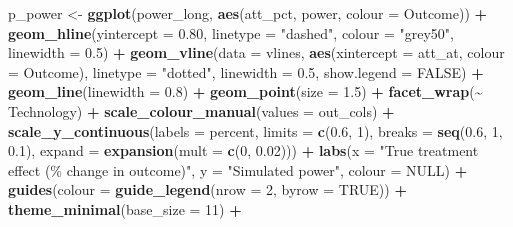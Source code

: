 \documentclass[
]{article}
\newenvironment{Shaded}{\begin{snugshade}}{\end{snugshade}}
\newcommand{\AttributeTok}[1]{\textcolor[rgb]{0.13,0.29,0.53}{#1}}
\newcommand{\ConstantTok}[1]{\textcolor[rgb]{0.56,0.35,0.01}{#1}}
\newcommand{\DecValTok}[1]{\textcolor[rgb]{0.00,0.00,0.81}{#1}}
\newcommand{\FloatTok}[1]{\textcolor[rgb]{0.00,0.00,0.81}{#1}}
\newcommand{\FunctionTok}[1]{\textcolor[rgb]{0.13,0.29,0.53}{\textbf{#1}}}
\newcommand{\NormalTok}[1]{#1}
\newcommand{\OtherTok}[1]{\textcolor[rgb]{0.56,0.35,0.01}{#1}}
\newcommand{\SpecialCharTok}[1]{\textcolor[rgb]{0.81,0.36,0.00}{\textbf{#1}}}
\newcommand{\StringTok}[1]{\textcolor[rgb]{0.31,0.60,0.02}{#1}}
\begin{document}
\begin{Shaded}
\begin{Highlighting}[]
\NormalTok{  p\_power }\OtherTok{\textless{}{-}} \FunctionTok{ggplot}\NormalTok{(power\_long,}
                    \FunctionTok{aes}\NormalTok{(att\_pct, power, }\AttributeTok{colour =}\NormalTok{ Outcome)) }\SpecialCharTok{+}
    \FunctionTok{geom\_hline}\NormalTok{(}\AttributeTok{yintercept =} \FloatTok{0.80}\NormalTok{, }\AttributeTok{linetype =} \StringTok{"dashed"}\NormalTok{,}
               \AttributeTok{colour =} \StringTok{"grey50"}\NormalTok{, }\AttributeTok{linewidth =} \FloatTok{0.5}\NormalTok{) }\SpecialCharTok{+}
    \FunctionTok{geom\_vline}\NormalTok{(}\AttributeTok{data =}\NormalTok{ vlines,}
               \FunctionTok{aes}\NormalTok{(}\AttributeTok{xintercept =}\NormalTok{ att\_at, }\AttributeTok{colour =}\NormalTok{ Outcome),}
               \AttributeTok{linetype =} \StringTok{"dotted"}\NormalTok{, }\AttributeTok{linewidth =} \FloatTok{0.5}\NormalTok{, }\AttributeTok{show.legend =} \ConstantTok{FALSE}\NormalTok{) }\SpecialCharTok{+}
    \FunctionTok{geom\_line}\NormalTok{(}\AttributeTok{linewidth =} \FloatTok{0.8}\NormalTok{) }\SpecialCharTok{+}
    \FunctionTok{geom\_point}\NormalTok{(}\AttributeTok{size =} \FloatTok{1.5}\NormalTok{) }\SpecialCharTok{+}
    \FunctionTok{facet\_wrap}\NormalTok{(}\SpecialCharTok{\textasciitilde{}}\NormalTok{ Technology) }\SpecialCharTok{+}
    \FunctionTok{scale\_colour\_manual}\NormalTok{(}\AttributeTok{values =}\NormalTok{ out\_cols) }\SpecialCharTok{+}
    \FunctionTok{scale\_y\_continuous}\NormalTok{(}\AttributeTok{labels =}\NormalTok{ percent, }\AttributeTok{limits =} \FunctionTok{c}\NormalTok{(}\FloatTok{0.6}\NormalTok{, }\DecValTok{1}\NormalTok{),}
                       \AttributeTok{breaks =} \FunctionTok{seq}\NormalTok{(}\FloatTok{0.6}\NormalTok{, }\DecValTok{1}\NormalTok{, }\FloatTok{0.1}\NormalTok{), }\AttributeTok{expand =} \FunctionTok{expansion}\NormalTok{(}\AttributeTok{mult =} \FunctionTok{c}\NormalTok{(}\DecValTok{0}\NormalTok{, }\FloatTok{0.02}\NormalTok{))) }\SpecialCharTok{+}
    \FunctionTok{labs}\NormalTok{(}\AttributeTok{x =} \StringTok{"True treatment effect (\% change in outcome)"}\NormalTok{,}
         \AttributeTok{y =} \StringTok{"Simulated power"}\NormalTok{, }\AttributeTok{colour =} \ConstantTok{NULL}\NormalTok{) }\SpecialCharTok{+}
    \FunctionTok{guides}\NormalTok{(}\AttributeTok{colour =} \FunctionTok{guide\_legend}\NormalTok{(}\AttributeTok{nrow =} \DecValTok{2}\NormalTok{, }\AttributeTok{byrow =} \ConstantTok{TRUE}\NormalTok{)) }\SpecialCharTok{+}
    \FunctionTok{theme\_minimal}\NormalTok{(}\AttributeTok{base\_size =} \DecValTok{11}\NormalTok{) }\SpecialCharTok{+}

\end{Highlighting}
\end{Shaded}
\end{document}
